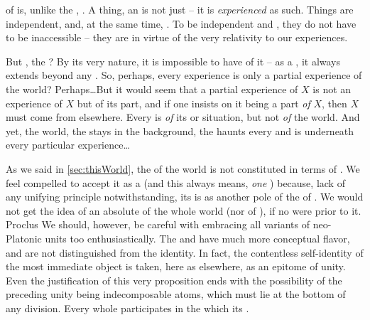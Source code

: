   

 of  is, unlike the , .  A thing, an  is not just 
-- it is {\em experienced} as such.  Things are independent,  and,
at the same time, .  To be independent and , they
do not have to be inaccessible -- they are  in virtue of the very
relativity to our experiences.

But , the ? By its very nature, it is
impossible to have  of it -- as a , it always extends
beyond any . So, perhaps, every experience is only a
partial experience of the world? Perhaps\ldots But it would seem that a partial
experience of $X$ is not an experience of $X$ but of its part, and if one
insists on it being a part {\em of} $X$, then $X$ must come from elsewhere.
Every  is  {\em of} its  or
situation, but not {\em of} the world. And yet, the world, the  stays in the background, the  haunts every
 and is  underneath every 
particular experience\ldots



\label{pa:perspectives}
As we said in \ref{sec:thisWorld}, the
 of the world is not constituted in terms of . We
feel compelled to accept it as a  (and this always means, {\em one}
) because, lack of any unifying principle notwithstanding, its
 is  as another pole of the  of .
We would not get the idea of an absolute  of the whole world (nor
of ), if no  were  prior to it.
\citet{Every whole composed of parts participates in a unity preceding these
  parts.}{Proclus}{  We should, however, be careful with
  embracing all variants of  neo-Platonic units too
  enthusiastically. The  and  have much more conceptual
  flavor, and are not distinguished from the  identity. In fact,
  the contentless self-identity of the most immediate object is taken, here as
  elsewhere, as an epitome of unity. Even the justification of this very
  proposition ends with the possibility of the preceding unity being
  indecomposable atoms, which must lie at the bottom of any division.}  Every
whole participates in the  which  its .

